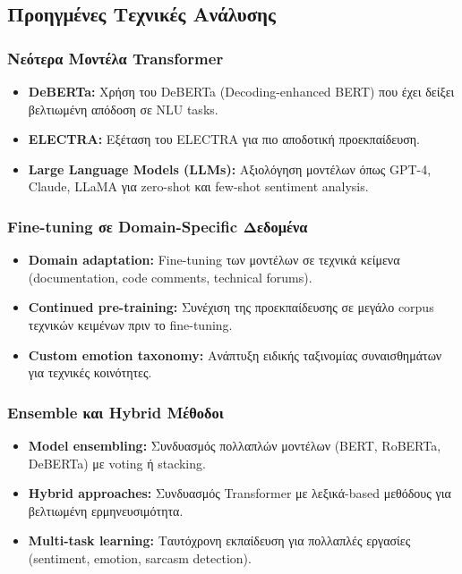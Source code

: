\documentclass[a4paper,11pt,oneside,openany]{ioniothesis}
\begin{document}
\subsection{Προηγμένες Τεχνικές Ανάλυσης}
\label{sec:Προηγμένες Τεχνικές Ανάλυσης}

\subsubsection{Νεότερα Μοντέλα Transformer}

\begin{itemize}
    \item \textbf{DeBERTa:} Χρήση του DeBERTa (Decoding-enhanced BERT) που έχει δείξει βελτιωμένη απόδοση σε NLU tasks.
    
    \item \textbf{ELECTRA:} Εξέταση του ELECTRA για πιο αποδοτική προεκπαίδευση.
    
    \item \textbf{Large Language Models (LLMs):} Αξιολόγηση μοντέλων όπως GPT-4, Claude, LLaMA για zero-shot και few-shot sentiment analysis.
\end{itemize}

\subsubsection{Fine-tuning σε Domain-Specific Δεδομένα}

\begin{itemize}
    \item \textbf{Domain adaptation:} Fine-tuning των μοντέλων σε τεχνικά κείμενα (documentation, code comments, technical forums).
    
    \item \textbf{Continued pre-training:} Συνέχιση της προεκπαίδευσης σε μεγάλο corpus τεχνικών κειμένων πριν το fine-tuning.
    
    \item \textbf{Custom emotion taxonomy:} Ανάπτυξη ειδικής ταξινομίας συναισθημάτων για τεχνικές κοινότητες.
\end{itemize}

\subsubsection{Ensemble και Hybrid Μέθοδοι}

\begin{itemize}
    \item \textbf{Model ensembling:} Συνδυασμός πολλαπλών μοντέλων (BERT, RoBERTa, DeBERTa) με voting ή stacking.
    
    \item \textbf{Hybrid approaches:} Συνδυασμός Transformer με λεξικά-based μεθόδους για βελτιωμένη ερμηνευσιμότητα.
    
    \item \textbf{Multi-task learning:} Ταυτόχρονη εκπαίδευση για πολλαπλές εργασίες (sentiment, emotion, sarcasm detection).
\end{itemize}
\end{document}
